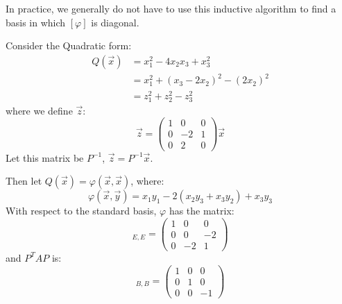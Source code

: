 \documentclass[../Main.tex]{subfiles}
\begin{document}
\begin{example}
    In practice, we generally do not have to use this inductive algorithm to find a basis in which $[\varphi]$ is diagonal.

    Consider the Quadratic form:
    \begin{align*}
        Q(\vec{x}) &= x_1^2 - 4x_2 x_3 + x_3^2 \\
        &= x_1^2 + (x_3 - 2x_2)^2 - (2x_2)^2 \\
        &= z_1^2 + z_2^2 - z_3^2
    \end{align*}
    where we define $\vec{z}$:
    \begin{equation*}
        \vec{z} =
        \begin{pmatrix}
            1 & 0 & 0 \\
            0 & -2 & 1 \\
            0 & 2 & 0
        \end{pmatrix}
        \vec{x}
    \end{equation*}
    Let this matrix be $P^{-1}$, $\vec{z} = P^{-1} \vec{x}$.

    Then let $Q(\vec{x}) = \varphi(\vec{x}, \vec{x})$, where:
    \begin{equation*}
        \varphi(\vec{x}, \vec{y}) = x_1 y_1 - 2(x_2 y_3 + x_3 y_2) + x_3 y_3
    \end{equation*}
    With respect to the standard basis, $\varphi$ has the matrix:
    \begin{equation*}
        [\varphi]_{E, E} =
        \begin{pmatrix}
            1 & 0 & 0 \\
            0 & 0 & -2 \\
            0 & -2 & 1
        \end{pmatrix}
    \end{equation*}
    and $P^T A P$ is:
    \begin{equation*}
        [\varphi]_{B, B} =
        \begin{pmatrix}
            1 & 0 & 0 \\
            0 & 1 & 0 \\
            0 & 0 & -1
        \end{pmatrix}
    \end{equation*}
\end{example}
\end{document}
